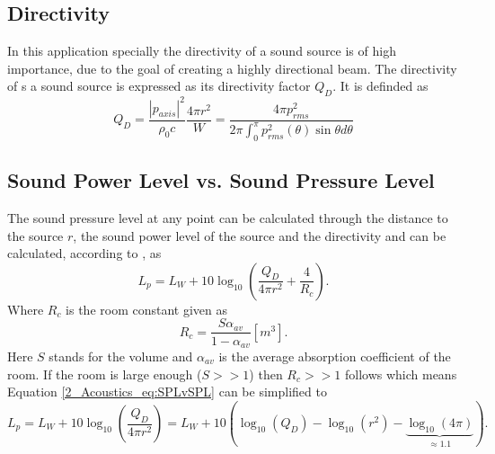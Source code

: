 \subsection{Directivity}
In this application specially the directivity of a sound source is of high importance, due to the goal of creating a highly directional beam. 
The directivity of s a sound source is expressed as its directivity factor $Q_D$. It is definded as \cite{DirectivityIndices}
\begin{equation}\label{2_Acoustics_eq:Directivity}
    Q_D = \frac{|p_{axis}|^2}{\rho_0 c}\frac{4 \pi r^2}{W} = \frac{4 \pi p_{rms}^2}{2\pi\int_0^{\pi}p^2_{rms}(\theta)\sin{\theta}d\theta} 
\end{equation}
\subsection{Sound Power Level vs. Sound Pressure Level}
The sound pressure level at any point can be calculated through the distance to the source $r$, the sound power level of the source and the directivity and can be calculated, according to \cite{Relationship_Sound_pressure}, as
\begin{equation}\label{2_Acoustics_eq:SPLvSPL}
    L_p = L_W + 10\log_{10}\left( \frac{Q_D}{4 \pi r^2} + \frac{4}{R_c} \right ).
\end{equation}
Where $R_c$ is the room constant given as
\begin{equation}
    R_c = \frac{S\alpha_{av}}{1 - \alpha_{av}} [m^3].
\end{equation}
Here $S$ stands for the volume  and $\alpha_{av}$ is the average absorption coefficient of the room.  If the room is large enough ($S >> 1$) then $R_c >> 1$ follows which means Equation \ref{2_Acoustics_eq:SPLvSPL} can be simplified to
\begin{equation}
     L_p 
     = 
     L_W + 10\log_{10}\left( \frac{Q_D}{4 \pi r^2} \right ) 
     =
     L_W + 10\left ( \log_{10}(Q_D) - \log_{10}(r^2) - \underbrace{\log_{10}(4\pi)}_{\approx 1.1}  \right ). 
\end{equation}